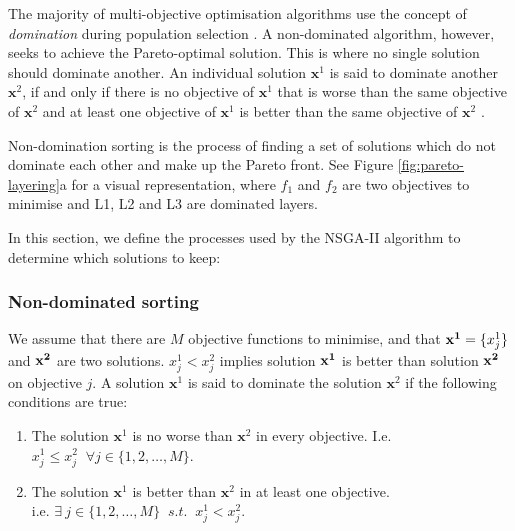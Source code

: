 The majority of multi-objective optimisation algorithms use the concept of \emph{domination} during population selection \cite{Burke2014}. A non-dominated algorithm, however, seeks to achieve the Pareto-optimal solution. This is where no single solution should dominate another. An individual solution $\mathbf{x}^{1}$ is said to dominate another $\mathbf{x}^{2}$, if and only if there is no objective of $\mathbf{x}^{1}$ that is worse than the same objective of $\mathbf{x}^{2}$ and at least one objective of $\mathbf{x}^{1}$ is better than the same objective of $\mathbf{x}^{2}$ \cite{Bao2017}. 


Non-domination sorting is the process of finding a set of solutions which do not dominate each other and make up the Pareto front. See Figure \ref{fig:pareto-layering}a for a visual representation, where $f_1$ and $f_2$ are two objectives to minimise and L1, L2 and L3 are dominated layers.


In this section, we define the processes used by the NSGA-II algorithm to determine which solutions to keep:
\subsubsection{Non-dominated sorting}
We assume that there are $M$ objective functions to minimise, and that ${\bf x^{1}} = \{x_j^{1}\}$ and $\bf x^{2}$ are two solutions. $x_j^{1}<x_j^{2}$ implies solution $\bf x^{1}$ is better than solution $\bf x^{2}$ on objective $j$. A solution $\mathbf{x}^{1}$ is said to dominate the solution $\mathbf{x}^{2}$ if the following conditions are true:
\begin{enumerate}
	\item The solution $\mathbf{x}^{1}$ is no worse than $\mathbf{x}^{2}$ in every objective. I.e. $x^{1}_j \leq x^{2}_j \;\;  \forall j \in\{1,2,\ldots,M\}$.
	\item The solution $\mathbf{x}^{1}$ is better than $\mathbf{x}^{2}$ in at least one objective. \\ i.e. $\exists\  {j}\in \{ 1,2,\ldots,M\} \;\; s.t. \;\;x^{1}_j < x^{2}_j$.
\end{enumerate}



